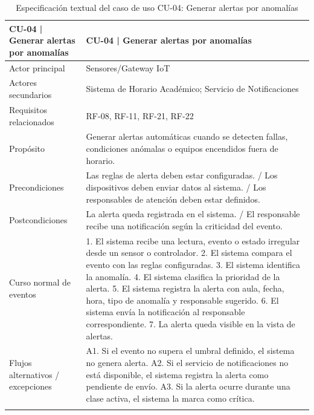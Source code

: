\begingroup
\small
\begin{longtable}{|p{7.8cm}|p{7.8cm}|}
\hline
CU-04 | Generar alertas por anomalías & CU-04 | Generar alertas por anomalías \\ \hline
Actor principal & Sensores/Gateway IoT \\ \hline
Actores secundarios & Sistema de Horario Académico; Servicio de Notificaciones \\ \hline
Requisitos relacionados & RF-08, RF-11, RF-21, RF-22 \\ \hline
Propósito & Generar alertas automáticas cuando se detecten fallas, condiciones anómalas o equipos encendidos fuera de horario. \\ \hline
Precondiciones & Las reglas de alerta deben estar configuradas. / Los dispositivos deben enviar datos al sistema. / Los responsables de atención deben estar definidos. \\ \hline
Postcondiciones & La alerta queda registrada en el sistema. / El responsable recibe una notificación según la criticidad del evento. \\ \hline
Curso normal de eventos & 1. El sistema recibe una lectura, evento o estado irregular desde un sensor o controlador. 2. El sistema compara el evento con las reglas configuradas. 3. El sistema identifica la anomalía. 4. El sistema clasifica la prioridad de la alerta. 5. El sistema registra la alerta con aula, fecha, hora, tipo de anomalía y responsable sugerido. 6. El sistema envía la notificación al responsable correspondiente. 7. La alerta queda visible en la vista de alertas. \\ \hline
Flujos alternativos / excepciones & A1. Si el evento no supera el umbral definido, el sistema no genera alerta. A2. Si el servicio de notificaciones no está disponible, el sistema registra la alerta como pendiente de envío. A3. Si la alerta ocurre durante una clase activa, el sistema la marca como crítica. \\ \hline
\caption{Especificación textual del caso de uso CU-04: Generar alertas por anomalías}
\end{longtable}
\endgroup

